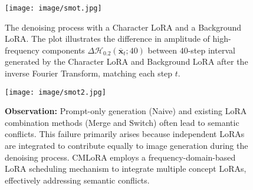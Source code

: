 \begin{figure}[ht]
    \centering
    \setlength{\abovecaptionskip}{2pt}
    \setlength{\belowcaptionskip}{-18pt}
    \begin{minipage}[b]{0.36\textwidth}
        \centering
        \texttt{[image: image/smot.jpg]}
        \caption{The denoising process with a Character LoRA and a Background LoRA. The plot illustrates the difference in amplitude of high-frequency components $\Delta\mathcal{H}_{0.2}\left(\overline{\mathbf{x}}_{t};40\right)$ between $40$-step interval generated by the Character LoRA and Background LoRA after the inverse Fourier Transform, matching each step $t$.}
        \label{fig:motivation}
    \end{minipage}\hfill
    \begin{minipage}[b]{0.62\textwidth}
        \centering
        \texttt{[image: image/smot2.jpg]}
        \caption{\textbf{Observation:} Prompt-only generation (Naive) and existing LoRA combination methods (Merge and Switch) often lead to semantic conflicts. This failure primarily arises because independent LoRAs are integrated to contribute equally to image generation during the denoising process. CMLoRA employs a frequency-domain-based LoRA scheduling mechanism to integrate multiple concept LoRAs, effectively addressing semantic conflicts.}
        \label{fig:smot2}
    \end{minipage}
\end{figure}

